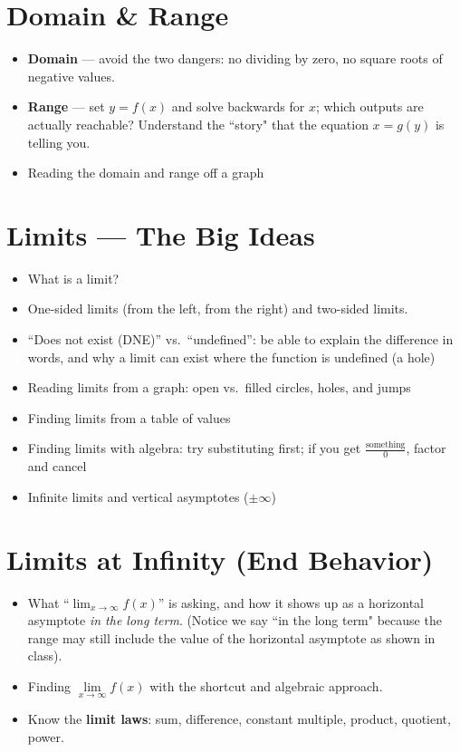 \documentclass[12pt]{article}
\begin{document}
\section*{Domain \& Range}
\begin{itemize}
  \item \textbf{Domain} --- avoid the two dangers: no dividing by zero, no square roots of negative values.
  \item \textbf{Range} --- set $y = f(x)$ and solve backwards for $x$; which outputs are actually reachable? Understand the ``story" that the equation $x = g(y)$ is telling you.
  \item Reading the domain and range off a graph
\end{itemize}
\section*{Limits --- The Big Ideas}
\begin{itemize}
  \item What is a limit?
  \item One-sided limits (from the left, from the right) and two-sided limits.
  \item ``Does not exist (DNE)'' vs.\ ``undefined'': \quad be able to explain the difference in words, and why a limit can exist where the function is undefined (a hole)
  \item Reading limits from a graph: open vs.\ filled circles, holes, and jumps
  \item Finding limits from a table of values
  \item Finding limits with algebra: try substituting first; if you get $\tfrac{\text{something}}{0}$, factor and cancel
  \item Infinite limits and vertical asymptotes ($\pm\infty$)
\end{itemize}
\section*{Limits at Infinity (End Behavior)}
\begin{itemize}
  \item What ``$\displaystyle\lim_{x\to\infty} f(x)$'' is asking, and how it shows up as a horizontal asymptote \textit{in the long term}. (Notice we say ``in the long term" because the range may still include the value of the horizontal asymptote as shown in class).
  \item Finding $\lim\limits_{x\to\infty} f(x)$ with the shortcut and algebraic approach.
  \item Know the \textbf{limit laws}: sum, difference, constant multiple, product, quotient, power.
\end{itemize}
\end{document}
